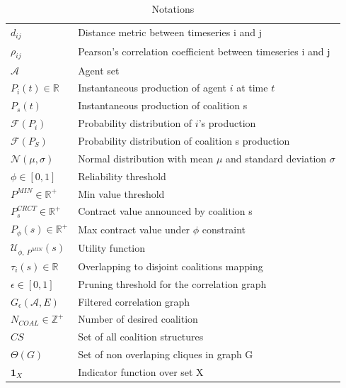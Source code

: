 \documentclass[conference]{IEEEtran}
\begin{document}
\begin{table}[t]
\centering
\scriptsize
\begin{tabular}{l|p{4.5cm}}
  \hline 
  $ d_{ij} $ & Distance metric between timeseries i and j \\
  $ \rho_{ij} $ & Pearson's correlation coefficient between timeseries i and j \\
  $ \mathcal{A} $ & Agent set \\
  $ P_{i}(t) \in \mathbb{R} $ & Instantaneous production of agent $i$ at time $t$ \\
  $ P_{s}(t) $ & Instantaneous production of coalition s \\
  $ \mathcal{F}(P_{i}) $ & Probability distribution of $i$'s production \\
  $ \mathcal{F}(P_{S}) $ & Probability distribution of coalition s production \\
  $ \mathcal{N}(\mu, \sigma) $ & Normal distribution with mean $ \mu $ and standard deviation $ \sigma $ \\
  $ \phi \in [0,1] $ & Reliability threshold \\
  $ P^{MIN} \in \mathbb{R}^+ $ & Min value threshold \\
  $ P_{s}^{CRCT} \in \mathbb{R}^+ $ & Contract value announced by coalition s \\
  $ P_{\phi}(s) \in \mathbb{R}^+ $ & Max contract value under $ \phi $ constraint \\
  $ \mathcal{U}_{\phi,\ P^{MIN}}(s) $ & Utility function \\
  $ \tau_{i}(s) \in \mathbb{R}$ & Overlapping to disjoint coalitions mapping \\
  $ \epsilon \in [0,1] $ & Pruning threshold for the correlation graph \\
  $ G_{\epsilon}(\mathcal{A}, E) $ & Filtered correlation graph \\
  $ N_{COAL} \in \mathbb{Z}^+ $ & Number of desired coalition \\
  $ CS $ & Set of all coalition structures \\
  $ \Theta(G) $ & Set of non overlaping cliques in graph G \\
  $ \mathbf{1}_{X} $ & Indicator function over set X \\ 
  \hline
\end{tabular}

\caption{Notations\label{table1}}
\end{table}
\end{document}
